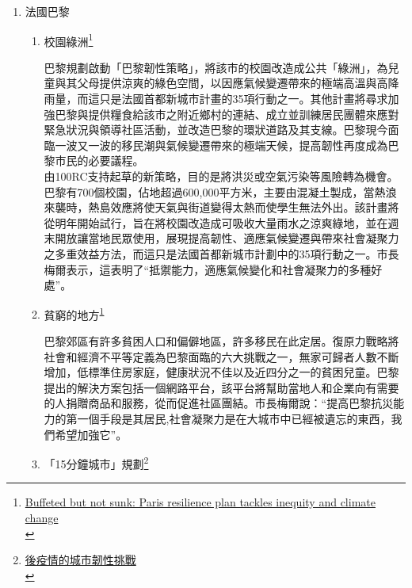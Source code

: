 \documentclass[a4paper,12pt]{article}
\begin{document}
\begin{enumerate}
\item 法國巴黎
\label{sec:org71f5f03}

\begin{enumerate}
\item 校園綠洲\footnote{\href{https://www.eco-business.com/news/buffeted-but-not-sunk-paris-resilience-plan-tackles-inequity-and-climate-change/}{Buffeted but not sunk: Paris resilience plan tackles inequity and climate change }\\\label{org56f5079}}
\label{sec:org218562b}

巴黎規劃啟動「巴黎韌性策略」，將該市的校園改造成公共「綠洲」，為兒童與其父母提供涼爽的綠色空間，以因應氣候變遷帶來的極端高溫與高降雨量，而這只是法國首都新城市計畫的35項行動之一。其他計畫將尋求加強巴黎與提供糧食給該市之附近鄉村的連結、成立並訓練居民團體來應對緊急狀況與領導社區活動，並改造巴黎的環狀道路及其支線。巴黎現今面臨一波又一波的移民潮與氣候變遷帶來的極端天候，提高韌性再度成為巴黎市民的必要議程。\\
由100RC支持起草的新策略，目的是將洪災或空氣污染等風險轉為機會。巴黎有700個校園，佔地超過600,000平方米，主要由混凝土製成，當熱浪來襲時，熱島效應將使天氣與街道變得太熱而使學生無法外出。該計畫將從明年開始試行，旨在將校園改造成可吸收大量雨水之涼爽綠地，並在週末開放讓當地民眾使用，展現提高韌性、適應氣候變遷與帶來社會凝聚力之多重效益方法，而這只是法國首都新城市計劃中的35項行動之一。市長梅爾表示，這表明了“抵禦能力，適應氣候變化和社會凝聚力的多種好處”。\\

\item 貧窮的地方\textsuperscript{\ref{org56f5079}}
\label{sec:org33b9f3f}

巴黎郊區有許多貧困人口和偏僻地區，許多移民在此定居。復原力戰略將社會和經濟不平等定義為巴黎面臨的六大挑戰之一，無家可歸者人數不斷增加，低標準住房家庭，健康狀況不佳以及近四分之一的貧困兒童。巴黎提出的解決方案包括一個網路平台，該平台將幫助當地人和企業向有需要的人捐贈商品和服務，從而促進社區團結。市長梅爾說：“提高巴黎抗災能力的第一個手段是其居民,社會凝聚力是在大城市中已經被遺忘的東西，我們希望加強它”。\\

\item 「15分鐘城市」規劃\footnote{\href{https://rsprc.ntu.edu.tw/zh-tw/m01-3/understand-risk-society/1550-1100222-covid.html}{後疫情的城市韌性挑戰 }\\}
\label{sec:orgd542f73}


\end{enumerate}
\end{enumerate}
\end{document}
